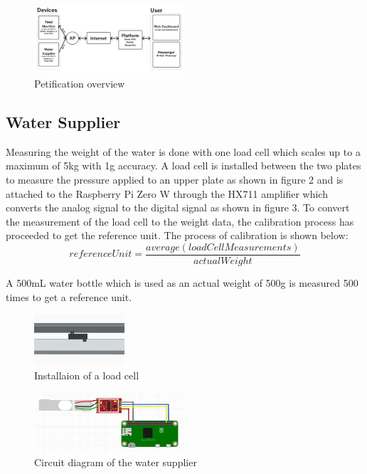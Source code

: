 \documentclass[conference]{IEEEtran}
\begin{document}
\begin{figure}[htbp]
\centerline{\includegraphics[width=0.5\textwidth]{./images/Overview.png}}
\caption{Petification overview}
\label{fig}
\end{figure}

\subsection{Water Supplier}
Measuring the weight of the water is done with one load cell which scales up to a maximum of 5kg with 1g accuracy.
A load cell is installed between the two plates to measure the pressure applied to an upper plate as shown in figure 2 and is attached to the Raspberry Pi Zero W through the HX711 amplifier which converts the analog signal to the digital signal as shown in figure 3.
To convert the measurement of the load cell to the weight data, the calibration process has proceeded to get the reference unit.
The process of calibration is shown below:
\[
	referenceUnit = \frac{average(loadCellMeasurements)}{actualWeight}
\]

A 500mL water bottle which is used as an actual weight of 500g is measured 500 times to get a reference unit.

\begin{figure}[htbp]
\centerline{\includegraphics[width=0.3\textwidth]{./images/load-cell.png}}
\caption{Installaion of a load cell}
\label{fig}
\end{figure}

\begin{figure}[htbp]
\centerline{\includegraphics[width=0.5\textwidth]{./images/water supplier circuit.jpg}}
\caption{Circuit diagram of the water supplier}
\label{fig}
\end{figure}
\end{document}

